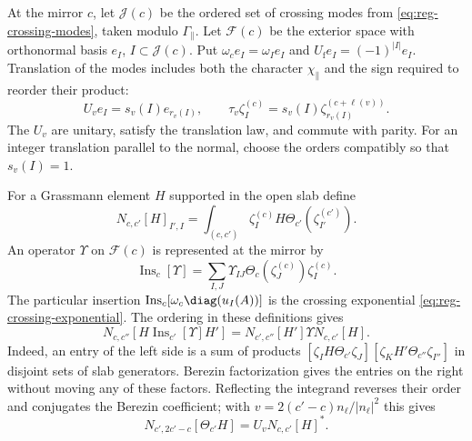 At the mirror $c$, let $\mathcal J(c)$ be the ordered set of crossing
modes from \eqref{eq:reg-crossing-modes}, taken modulo
$\Gamma_\parallel$. Let $\mathcal F(c)$ be the exterior space with
orthonormal basis $e_I$, $I\subset\mathcal J(c)$. Put
$\omega_c e_I=\omega_Ie_I$ and $U_{\mathrm f}e_I=(-1)^{|I|}e_I$.
Translation of the modes includes both the character
$\chi_\parallel$ and the sign required to reorder their product:
\[
 U_ve_I=s_v(I)e_{r_v(I)},\qquad
 \tau_v\zeta_I^{(c)}=s_v(I)\zeta_{r_v(I)}^{(c+\ell(v))}.
\]
The $U_v$ are unitary, satisfy the translation law, and commute with
parity. For an integer translation parallel to the normal, choose the
orders compatibly so that $s_v(I)=1$.

For a Grassmann element $H$ supported in the open slab define
\begin{equation}\label{eq:slab-fermion-matrix}
 N_{c,c'}[H]_{I',I}
    =\int_{(c,c')}\zeta_I^{(c)}H
                        \Theta_{c'}(\zeta_{I'}^{(c')}).
\end{equation}
An operator $\Upsilon$ on $\mathcal F(c)$ is represented at the
mirror by
\[
 \operatorname{Ins}_c[\Upsilon]
       =\sum_{I,J}\Upsilon_{IJ}\Theta_c(\zeta_J^{(c)})\zeta_I^{(c)}.
\]
The particular insertion
$\operatorname{Ins}_c[\omega_c\diag(u_I(A))]$ is the crossing
exponential \eqref{eq:reg-crossing-exponential}. The ordering in these
definitions gives
\begin{equation}\label{eq:slab-matrix-composition}
 N_{c,c''}[H\operatorname{Ins}_{c'}[\Upsilon]H']
             =N_{c',c''}[H']\Upsilon N_{c,c'}[H].
\end{equation}
Indeed, an entry of the left side is a sum of products
$[\zeta_IH\Theta_{c'}\zeta_J]
 [\zeta_KH'\Theta_{c''}\zeta_{I''}]$ in disjoint sets of slab
generators. Berezin factorization gives the entries on the right
without moving any of these factors. Reflecting the integrand reverses
their order and conjugates the Berezin coefficient; with
$v=2(c'-c)n_\ell/|n_\ell|^2$ this gives
\begin{equation}\label{eq:slab-matrix-adjoint}
 N_{c',2c'-c}[\Theta_{c'}H]=U_vN_{c,c'}[H]^*.
\end{equation}


